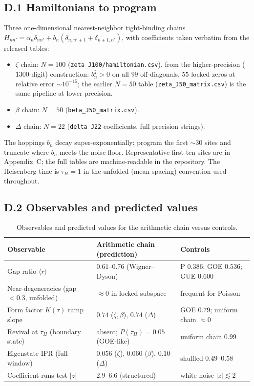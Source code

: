 \documentclass[aps,prx,reprint,floatfix]{revtex4-2}
\begin{document}
\subsection{D.1 Hamiltonians to program}
Three one-dimensional nearest-neighbor tight-binding chains
$H_{nn'}=\alpha_n\delta_{nn'}+b_n(\delta_{n,n'+1}+\delta_{n+1,n'})$,
with coefficients taken verbatim from the released tables:
\begin{itemize}[leftmargin=1.4em]
\item $\zeta$ chain: $N=100$ (\texttt{zeta\_J100/hamiltonian.csv}), from the
higher-precision ($1300$-digit) construction: $b_n^2>0$ on all $99$
off-diagonals, $55$ locked zeros at relative error $\sim10^{-15}$; the earlier
$N=50$ table (\texttt{zeta\_J50\_matrix.csv}) is the same pipeline at lower
precision.
\item $\beta$ chain: $N=50$ (\texttt{beta\_J50\_matrix.csv}).
\item $\Delta$ chain: $N=22$ (\texttt{delta\_J22} coefficients, full
precision strings).
\end{itemize}
The hoppings $b_n$ decay super-exponentially; program the first $\sim30$
sites and truncate where $b_n$ meets the noise floor. Representative first
ten sites are in Appendix~C; the full tables are machine-readable in the
repository. The Heisenberg time is $\tau_H=1$ in the unfolded (mean-spacing)
convention used throughout.

\subsection{D.2 Observables and predicted values}
\begin{table}[t]
\centering
\footnotesize
\caption{Observables and predicted values for the arithmetic chain versus controls.}
\label{tab:observables}
\begin{tabular}{lll}
\toprule
Observable & Arithmetic chain (prediction) & Controls \\
\midrule
Gap ratio $\langle r\rangle$ & $0.61$--$0.76$ (Wigner--Dyson) &
  P $0.386$; GOE $0.536$; GUE $0.600$\\
Near-degeneracies (gap$<0.3$, unfolded) & $\approx0$ in locked subspace &
  frequent for Poisson\\
Form factor $K(\tau)$ ramp slope & $0.74$ ($\zeta,\beta$), $0.74$ ($\Delta$) &
  GOE $0.79$; uniform chain $\approx0$\\
Revival at $\tau_H$ (boundary state) & absent; $P(\tau_H)=0.05$ (GOE-like) &
  uniform chain $0.99$\\
Eigenstate IPR (full window) & $0.056$ ($\zeta$), $0.060$ ($\beta$),
  $0.10$ ($\Delta$) & shuffled $0.49$--$0.58$\\
Coefficient runs test $|z|$ & $2.9$--$6.6$ (structured) & white noise $|z|\lesssim2$\\
\bottomrule
\end{tabular}
\end{table}
\end{document}
